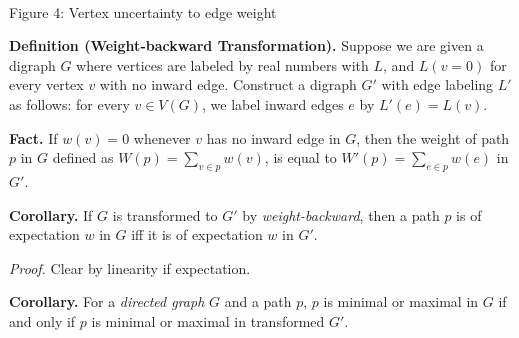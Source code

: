 \begin{center}
     \\
    Figure 4: Vertex uncertainty to edge weight
\end{center}

\textbf{Definition (Weight-backward Transformation).} Suppose we are given a digraph $G$ where vertices are labeled by real numbers with $L$, and $L(v = 0)$ for every vertex $v$ with no inward edge. Construct a digraph $G'$ with edge labeling $L'$ as follows: for every $v \in V(G)$, we label inward edges $e$ by $L'(e) = L(v)$.

\textbf{Fact.} If $w(v) = 0$ whenever $v$ has no inward edge in $G$, then the weight of path $p$ in $G$ defined as $W(p) = \sum_{v \in p} w(v)$, is equal to $W'(p) = \sum\limits_{e \in p}w(e)$ in $G'$.


\textbf{Corollary.} If $G$ is transformed to $G'$ by \textit{weight-backward}, then a path $p$ is of expectation $w$ in $G$ iff it is of expectation $w$ in $G'$.

\textit{Proof.} Clear by linearity if expectation.



\textbf{Corollary.} For a \textit{directed graph} $G$ and a path $p$, $p$ is minimal or maximal in $G$ if and only if $p$ is minimal or maximal in transformed $G'$.


